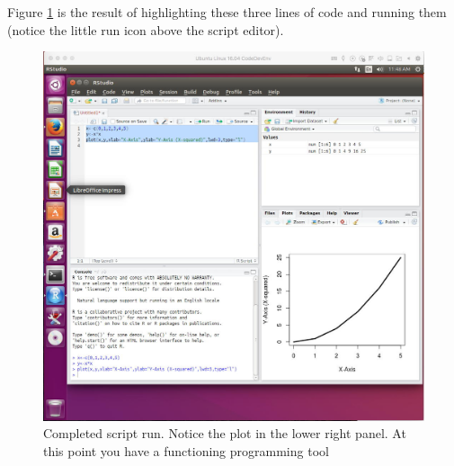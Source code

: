 Figure \ref{fig:LinuxRStudioCompleted}  is the result of highlighting these three lines of code and running them (notice the little run icon above the script editor).

\begin{figure}[h!] %
   \centering
   \includegraphics[width=4.5in]{./1-Introduction/LinuxRStudioCompleted.jpg} 
   \caption{Completed script run.  Notice the plot in the lower right panel.  At this point you have a functioning programming tool}
   \label{fig:LinuxRStudioCompleted}
\end{figure}

\clearpage


